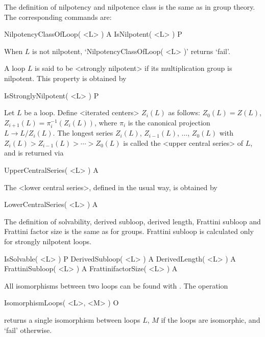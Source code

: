 
The definition of nilpotency and nilpotence class is the same as in group
theory. The corresponding commands are:

\>NilpotencyClassOfLoop( <L> ) A
\>IsNilpotent( <L> ) P

When $L$ is not nilpotent, `NilpotencyClassOfLoop( <L> )' returns `fail'.

A loop $L$ is said to be <strongly nilpotent> if its
multiplication group is nilpotent. This property is obtained by

\>IsStronglyNilpotent( <L> ) P

Let $L$ be a loop. Define <iterated centers> $Z_i(L)$ as
follows: $Z_0(L)=Z(L)$, $Z_{i+1}(L) = \pi_i^{-1}( Z_i(L) )$, where $\pi_i$ is
the canonical projection $L\to L/Z_i(L)$. The longest series $Z_i(L)$,
$Z_{i-1}(L)$, $\dots$, $Z_0(L)$ with $Z_i(L)>Z_{i-1}(L)>\cdots >Z_0(L)$ is
called the <upper central series> of $L$, and is
returned via

\>UpperCentralSeries( <L> ) A

The <lower central series>, defined in the usual
way, is obtained by

\>LowerCentralSeries( <L> ) A


The definition of solvability, derived subloop, derived length, Frattini
subloop and Frattini factor size is the same as for groups. Frattini subloop is
calculated only for strongly nilpotent loops.

\>IsSolvable( <L> ) P
\>DerivedSubloop( <L> ) A
\>DerivedLength( <L> ) A
\>FrattiniSubloop( <L> ) A
\>FrattinifactorSize( <L> ) A


All isomorphisms between two loops can be found with {\LOOPS}. The operation

\>IsomorphismLoops( <L>, <M> ) O

returns a single isomorphism between loops $L$, $M$ if the loops are
isomorphic, and `fail' otherwise.

